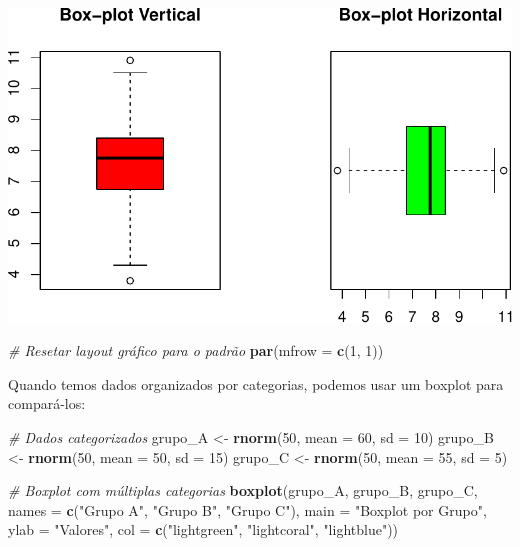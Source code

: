 \documentclass[
]{book}
\newenvironment{Shaded}{\begin{snugshade}}{\end{snugshade}}
\newcommand{\AttributeTok}[1]{\textcolor[rgb]{0.13,0.29,0.53}{#1}}
\newcommand{\CommentTok}[1]{\textcolor[rgb]{0.56,0.35,0.01}{\textit{#1}}}
\newcommand{\DecValTok}[1]{\textcolor[rgb]{0.00,0.00,0.81}{#1}}
\newcommand{\FunctionTok}[1]{\textcolor[rgb]{0.13,0.29,0.53}{\textbf{#1}}}
\newcommand{\NormalTok}[1]{#1}
\newcommand{\OtherTok}[1]{\textcolor[rgb]{0.56,0.35,0.01}{#1}}
\newcommand{\StringTok}[1]{\textcolor[rgb]{0.31,0.60,0.02}{#1}}
\begin{document}
\includegraphics{introR_files/figure-latex/unnamed-chunk-177-1.pdf}

\begin{Shaded}
\begin{Highlighting}[]
\CommentTok{\# Resetar layout gráfico para o padrão}
\FunctionTok{par}\NormalTok{(}\AttributeTok{mfrow =} \FunctionTok{c}\NormalTok{(}\DecValTok{1}\NormalTok{, }\DecValTok{1}\NormalTok{))}
\end{Highlighting}
\end{Shaded}

Quando temos dados organizados por categorias, podemos usar um boxplot para compará-los:

\begin{Shaded}
\begin{Highlighting}[]
\CommentTok{\# Dados categorizados}
\NormalTok{grupo\_A }\OtherTok{\textless{}{-}} \FunctionTok{rnorm}\NormalTok{(}\DecValTok{50}\NormalTok{, }\AttributeTok{mean =} \DecValTok{60}\NormalTok{, }\AttributeTok{sd =} \DecValTok{10}\NormalTok{)}
\NormalTok{grupo\_B }\OtherTok{\textless{}{-}} \FunctionTok{rnorm}\NormalTok{(}\DecValTok{50}\NormalTok{, }\AttributeTok{mean =} \DecValTok{50}\NormalTok{, }\AttributeTok{sd =} \DecValTok{15}\NormalTok{)}
\NormalTok{grupo\_C }\OtherTok{\textless{}{-}} \FunctionTok{rnorm}\NormalTok{(}\DecValTok{50}\NormalTok{, }\AttributeTok{mean =} \DecValTok{55}\NormalTok{, }\AttributeTok{sd =} \DecValTok{5}\NormalTok{)}

\CommentTok{\# Boxplot com múltiplas categorias}
\FunctionTok{boxplot}\NormalTok{(grupo\_A, grupo\_B, grupo\_C, }
        \AttributeTok{names =} \FunctionTok{c}\NormalTok{(}\StringTok{"Grupo A"}\NormalTok{, }\StringTok{"Grupo B"}\NormalTok{, }\StringTok{"Grupo C"}\NormalTok{),}
        \AttributeTok{main =} \StringTok{"Boxplot por Grupo"}\NormalTok{,}
        \AttributeTok{ylab =} \StringTok{"Valores"}\NormalTok{,}
        \AttributeTok{col =} \FunctionTok{c}\NormalTok{(}\StringTok{"lightgreen"}\NormalTok{, }\StringTok{"lightcoral"}\NormalTok{, }\StringTok{"lightblue"}\NormalTok{))}
\end{Highlighting}
\end{Shaded}
\end{document}
